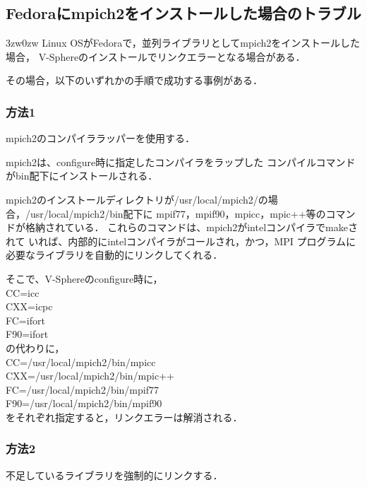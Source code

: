\subsection{Fedoraにmpich2をインストールした場合のトラブル}
\begin{indentation}{3zw}{0zw}
Linux OSがFedoraで，並列ライブラリとしてmpich2をインストールした場合，
V-Sphereのインストールでリンクエラーとなる場合がある．

その場合，以下のいずれかの手順で成功する事例がある．

\subsubsection{方法1}
mpich2のコンパイララッパーを使用する．

mpich2は、configure時に指定したコンパイラをラップした
コンパイルコマンドがbin配下にインストールされる．

mpich2のインストールディレクトリが/usr/local/mpich2/の場合，/usr/local/mpich2/bin配下に
mpif77，mpif90，mpicc，mpic++等のコマンドが格納されている．
これらのコマンドは、mpich2がintelコンパイラでmakeされて
いれば、内部的にintelコンパイラがコールされ，かつ，MPI
プログラムに必要なライブラリを自動的にリンクしてくれる．

そこで、V-Sphereのconfigure時に，\\
\hspace{1cm}CC=icc\\
\hspace{1cm}CXX=icpc\\
\hspace{1cm}FC=ifort\\
\hspace{1cm}F90=ifort\\
の代わりに，\\
\hspace{1cm}CC=/usr/local/mpich2/bin/mpicc\\
\hspace{1cm}CXX=/usr/local/mpich2/bin/mpic++\\
\hspace{1cm}FC=/usr/local/mpich2/bin/mpif77\\
\hspace{1cm}F90=/usr/local/mpich2/bin/mpif90\\
をそれぞれ指定すると，リンクエラーは解消される．

\subsubsection{方法2}
不足しているライブラリを強制的にリンクする．


\end{indentation}
